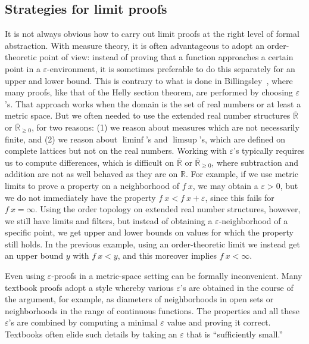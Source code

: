 \documentclass{svjour3}
\newcommand{\RR}{\mathbb{R}}
\newcommand{\ennRR}{\overline{\mathbb{R}}_{\ge 0}}
\newcommand{\eRR}{\overline{\mathbb{R}}}
\begin{document}
\subsection{Strategies for limit proofs}

It is not always obvious how to carry out limit proofs at the right level of formal abstraction. With measure theory, it is often advantageous to adopt an order-theoretic point of view: instead of proving that a function approaches a certain point in a $\varepsilon$-environment, it is sometimes preferable to do this separately for an upper and lower bound. This is contrary to what is done in Billingsley~\cite{billingsley:95}, where many proofs, like that of the Helly section theorem, are performed by choosing $\varepsilon$'s. That approach works when the domain is the set of real numbers or at least a metric space. But we often needed to use the extended real number structures $\eRR$ or $\ennRR$, for two reasons: (1) we reason about measures which are not necessarily finite, and (2) we reason about $\liminf$'s and $\limsup$'s, which are defined on complete lattices but not on the real numbers. Working with $\varepsilon$'s typically requires us to compute differences, which is difficult on $\eRR$ or $\ennRR$, where subtraction and addition are not as well behaved as they are on $\RR$. For example, if we use metric limits to prove a property on a neighborhood of $f~x$, we may obtain a $\varepsilon > 0$, but we do not immediately have the property $f~x < f~x + \varepsilon$, since this fails for $f~x = \infty$. Using the order topology on extended real number structures, however, we still have limits and filters, but instead of obtaining a $\varepsilon$-neighborhood of a specific point, we get upper and lower bounds on values for which the property still holds. In the previous example, using an order-theoretic limit we instead get an upper bound $y$ with $f~x < y$, and this moreover implies $f~x < \infty$.

Even using $\varepsilon$-proofs in a metric-space setting can be formally inconvenient. Many textbook proofs adopt a style whereby various $\varepsilon$'s are obtained in the course of the argument, for example, as diameters of neighborhoods in open sets or neighborhoods in the range of continuous functions. The properties and all these $\varepsilon$'s are combined by computing a minimal $\varepsilon$ value and proving it correct. Textbooks often elide such details by taking an $\varepsilon$ that is ``sufficiently small.''
\end{document}
